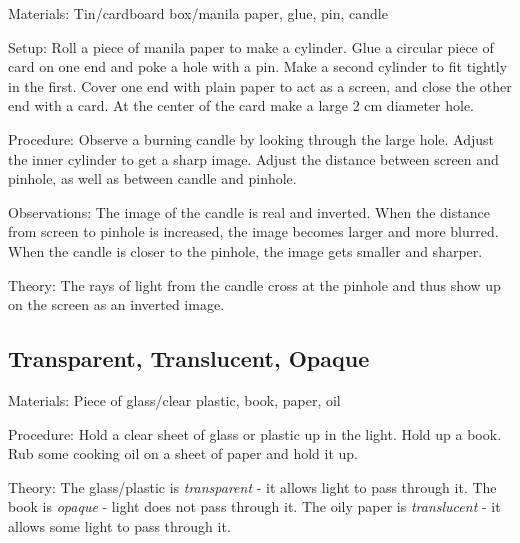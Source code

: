 \begin{multicols}{2}
\begin{description*}
\item[Materials:]{Tin/cardboard box/manila paper, glue, pin, candle}
\item[Setup:]{Roll a piece of manila paper to make a cylinder. Glue a circular piece of card on one end and poke a hole with a pin. Make a second cylinder to fit tightly in the first. Cover one end with plain paper to act as a screen, and close the other end with a card. At the center of the card make a large 2 cm diameter hole.}
\item[Procedure:]{Observe a burning candle by looking through the large hole. Adjust the inner cylinder to get a sharp image. Adjust the distance between screen and pinhole, as well as between candle and pinhole.}
\item[Observations:]{The image of the candle is real and inverted. When the distance from screen to pinhole is increased, the image becomes larger and more blurred. When the candle is closer to the pinhole, the image gets smaller and sharper.}
\item[Theory:]{The rays of light from the candle cross at the pinhole and thus show up on the screen as an inverted image.}
\end{description*}

\subsection{Transparent, Translucent, Opaque}


\begin{description*}
\item[Materials:]{Piece of glass/clear plastic, book, paper, oil}
\item[Procedure:]{Hold a clear sheet of glass or plastic up in the light. Hold up a book. Rub some cooking oil on a sheet of paper and hold it up.}
\item[Theory:]{The glass/plastic is \emph{transparent} - it allows light to pass through it. The book is \emph{opaque} - light does not pass through it. The oily paper is \emph{translucent} - it allows some light to pass through it.}
\end{description*}


\end{multicols}
